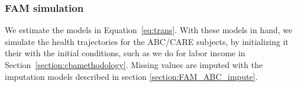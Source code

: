 %
%




\subsubsection{FAM simulation}
\label{appendix:health-fam-simulation}

\noindent We estimate the models in Equation~\eqref{eq:trans}. With these models in hand, we simulate the health trajectories for the ABC/CARE subjects, by initializing it their with the initial conditions, such as we do for labor income in Section~\ref{section:cbamethodology}. Missing values are imputed with the imputation models described in section \ref{section:FAM_ABC_impute}.

